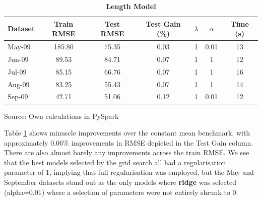 \documentclass[11pt,preprint, authoryear]{article}
\numberwithin{equation}{section}
\begin{document}
\footnotesize

\begin{longtable}[htbp] {@{} lcccccc @{}} 
\caption{\textbf{Length Model}} 
\label{tab:rand_count_model} \\
\toprule
\textbf{Dataset} &  \textbf{Train RMSE} &  \textbf{Test RMSE} &  \textbf{Test Gain (\%)} & \textbf{$\lambda$} & \textbf{$\alpha$} &  \textbf{Time (s)} \\
\midrule
May-09 &            185.80 &          75.35 &            0.03 &               1 &              0.01 &            13 \\
Jun-09 &             89.53 &          84.71 &            0.07 &               1 &              1 &            12 \\
Jul-09 &             85.15 &          66.76 &            0.07 &               1 &              1 &            16 \\
Aug-09 &             83.25 &          55.43 &            0.07 &               1 &              1 &            14 \\
Sep-09 &             42.71 &          51.06 &            0.12 &               1 &              0.01 &            12 \\
\bottomrule
\end{longtable}\begin{center} Source: Own calculations in PySpark\end{center}

\normalsize

Table \ref{tab:rand_count_model} shows minuscle improvements over the
constant mean benchmark, with approximately 0.06\% improvements in RMSE
depicted in the Test Gain column. There are also almost barely any
improvements across the train RMSE. We see that the best models selected
by the grid search all had a regularisation parameter of 1, implying
that full regularisation was employed, but the May and September
datasets stand out as the only models where \textbf{ridge} was selected
(alpha=0.01) where a selection of parameters were not entirely shrunk to
0.

\footnotesize
\end{document}
